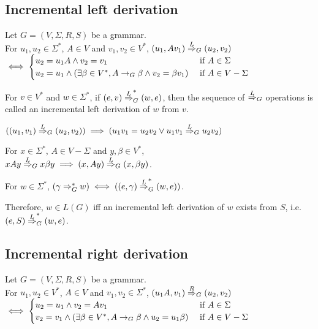 \subsection{Incremental left derivation}

\begin{definition}
Let $G = (V, \Sigma, R, S)$ be a grammar.\\
For $u_1, u_2 \in \Sigma^*$, $A \in V$ and $v_1, v_2 \in V^*$,
$(u_1, Av_1) \overset{L}{\Rightarrow}_{G} (u_2, v_2)$\\
$\iff \begin{cases}
u_2 = u_1A \wedge v_2 = v_1 & \textrm{ if } A \in \Sigma\\
u_2 = u_1 \wedge
(\exists \beta \in V^*, A \rightarrow_{G} \beta \wedge v_2 = \beta v_1)
& \textrm{ if } A \in V - \Sigma \end{cases}$
\end{definition}

For $v \in V^*$ and $w \in \Sigma^*$, if $(e, v) \overset{L}{\Rightarrow}_{G}^* (w, e)$,
then the sequence of $\overset{L}{\Rightarrow}_{G}$ operations
is called an incremental left derivation of $w$ from $v$.

\begin{lemma}
$((u_1, v_1) \overset{L}{\Rightarrow}_{G} (u_2, v_2)) \implies (u_1v_1 = u_2v_2 \vee u_1v_1 \overset{L}{\Rightarrow}_{G} u_2v_2)$
\end{lemma}
\begin{lemma}
For $x \in \Sigma^*$, $A \in V-\Sigma$ and $y, \beta \in V^*$,\\
$xAy \overset{L}{\Rightarrow}_{G} x\beta y \implies (x, Ay) \overset{L}{\Rightarrow}_{G} (x, \beta y)$.
\end{lemma}
\begin{theorem}
For $w \in \Sigma^*$,
$(\gamma \Rightarrow_{G}^* w) \iff ((e, \gamma) \overset{L}{\Rightarrow}_{G}^* (w, e))$.
\end{theorem}
Therefore, $w \in L(G)$ iff an incremental left derivation of $w$ exists from $S$,
i.e. $(e, S) \overset{L}{\Rightarrow}_{G}^* (w, e)$.

\subsection{Incremental right derivation}

\begin{definition}
Let $G = (V, \Sigma, R, S)$ be a grammar.\\
For $u_1, u_2 \in V^*$, $A \in V$ and $v_1, v_2 \in \Sigma^*$,
$(u_1A, v_1) \overset{R}{\Rightarrow}_{G} (u_2, v_2)$\\
$\iff \begin{cases}
u_2 = u_1 \wedge v_2 = Av_1 & \textrm{ if } A \in \Sigma\\
v_2 = v_1 \wedge
(\exists \beta \in V^*, A \rightarrow_{G} \beta \wedge u_2 = u_1\beta)
& \textrm{ if } A \in V - \Sigma \end{cases}$
\end{definition}


